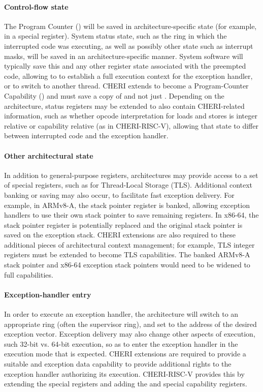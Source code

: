 \paragraph{Control-flow state}
The Program Counter (\PC{}) will be saved in
architecture-specific state (for example, in a special register).
System status state, such as the ring in which the interrupted code was
executing, as well as possibly other state such as interrupt masks, will be
saved in an architecture-specific manner.
System software will typically save this and any other register state
associated with the preempted code, allowing to to establish a full execution
context for the exception handler, or to switch to another thread.
CHERI extends \PC{} to become a Program-Counter Capability
(\PCC{}) and must save a copy of \PCC{} and not just \PC{}.
Depending on the architecture, status registers may be extended to also
contain CHERI-related information, such as whether opcode interpretation for
loads and stores is integer relative or capability relative (as in
CHERI-RISC-V), allowing that state to differ between interrupted code and the
exception handler.

\paragraph{Other architectural state}
In addition to general-purpose registers, architectures may provide access to
a set of special registers, such as for Thread-Local Storage (TLS).
Additional context banking or saving may also occur, to facilitate fast
exception delivery.
For example, in ARMv8-A, the stack pointer register is banked, allowing
exception handlers to use their own stack pointer to save remaining registers.
In x86-64, the stack pointer register is potentially replaced and the original
stack pointer is saved on the exception stack.
CHERI extensions are also required to these additional pieces of
architectural context management; for example, TLS integer registers must be
extended to become TLS capabilities.
The banked ARMv8-A stack pointer and x86-64 exception stack pointers
would need to be widened to full capabilities.

\paragraph{Exception-handler entry}
In order to execute an exception handler, the architecture will switch to an
appropriate ring (often the supervisor ring), and set \PC{} to the address of
the desired exception vector.
Exception delivery may also change other aspects of execution, such 32-bit
vs. 64-bit execution, so as to enter the exception handler in the execution
mode that is expected.
CHERI extensions are required to provide a suitable \PCC{} and
exception data capability to provide additional rights to the
exception handler authorizing its execution.
CHERI-RISC-V provides this by extending the \xtvec{} special registers
and adding the \xtdc{} and \xscratch{} special capability registers.


